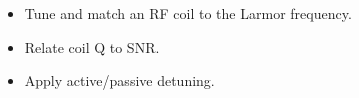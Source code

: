 \begin{objectives}
\begin{itemize}[leftmargin=1.4em,itemsep=2pt]
\item Tune and match an RF coil to the Larmor frequency.
\item Relate coil Q to SNR.
\item Apply active/passive detuning.
\end{itemize}
\end{objectives}
